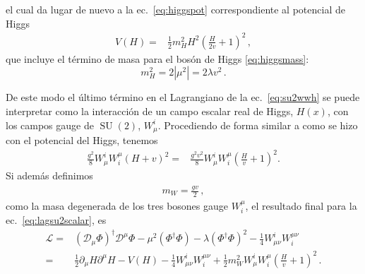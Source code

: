 el cual da lugar de nuevo a la ec.~\eqref{eq:higgspot} correspondiente al potencial de Higgs
\begin{align}
  \label{eq:vhfinal}
V(H)=& \frac{1}{2}m_H^2 H^2\left( \frac{H}{2v}+ 1 \right)^2\,,
\end{align}
que incluye el término de masa para el bosón de Higgs \eqref{eq:higgsmass}:
\begin{equation}
  m_H^2=2\left|\mu^2\right|=2\lambda v^2\,.
\end{equation}

De este modo el último término en el Lagrangiano de la ec.~\eqref{eq:su2wwh} se puede interpretar como la interacción de un campo escalar real de Higgs, $H(x)$, con los campos gauge de $\operatorname{SU}(2)$, $W_{\mu}^{i}$.  Procediendo de forma similar a como se hizo con el potencial del Higgs, tenemos 
\begin{align}
   \frac{g^2}{8} W^i_{\mu}W^{\mu}_{i}\left( H+v \right)^2
=&\frac{g^2v^2}{8} W^i_{\mu}W^{\mu}_{i}\left( \frac{H}{v}+1 \right)^2.
\end{align}
Si además definimos
\begin{align}
m_W=\frac{gv}{2}\,,   
\end{align}
como la masa degenerada de los tres bosones gauge $W_{i}^{\mu}$,
el resultado final para la ec.~\eqref{eq:lagsu2scalar}, es
\begin{align}
  \label{eq:su2wwh1}
  \mathcal{L}= &\left( \mathcal{D}_{\mu} \Phi\right)^{\dagger}\mathcal{D}^{\mu} \Phi-
                      \mu^2 \left( \Phi^{\dagger} \Phi\right)-\lambda \left( \Phi^{\dagger} \Phi\right)^2
                 -\frac{1}{4}W_{\mu\nu}^{i}W^{\mu\nu}_i \\
    \label{eq:su2wwh2}
  =&\frac{1}{2} \partial_{\mu} H \partial^{\mu}H -V(H) -\frac{1}{4}W_{\mu\nu}^{i}W^{\mu\nu}_i
    + \frac{1}{2}m_W^2 W^i_{\mu}W^{\mu}_{i}\left( \frac{H}{v}+1 \right)^2\,.
\end{align}

